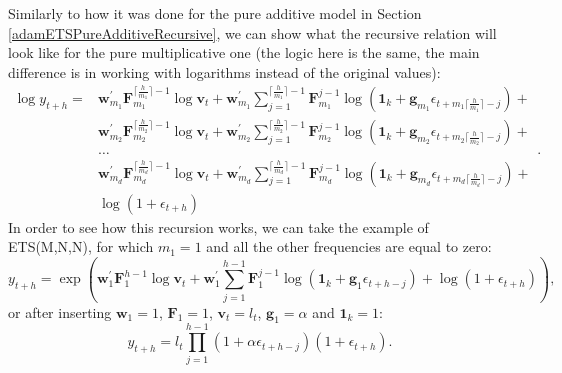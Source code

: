 \documentclass[
]{book}
\theoremstyle{definition}
\theoremstyle{definition}
\theoremstyle{definition}
\theoremstyle{definition}
\theoremstyle{remark}
\begin{document}
Similarly to how it was done for the pure additive model in Section \ref{adamETSPureAdditiveRecursive}, we can show what the recursive relation will look like for the pure multiplicative one (the logic here is the same, the main difference is in working with logarithms instead of the original values):
\begin{equation}
  \begin{aligned}
    \log y_{t+h} = & \mathbf{w}_{m_1}^\prime \mathbf{F}_{m_1}^{\lceil\frac{h}{m_1}\rceil-1} \log \mathbf{v}_{t} + \mathbf{w}_{m_1}^\prime \sum_{j=1}^{\lceil\frac{h}{m_1}\rceil-1} \mathbf{F}_{m_1}^{j-1} \log \left(\mathbf{1}_k + \mathbf{g}_{m_1} \epsilon_{t+m_1\lceil\frac{h}{m_1}\rceil-j}\right) + \\
    & \mathbf{w}_{m_2}^\prime \mathbf{F}_{m_2}^{\lceil\frac{h}{m_2}\rceil-1} \log \mathbf{v}_{t} + \mathbf{w}_{m_2}^\prime \sum_{j=1}^{\lceil\frac{h}{m_2}\rceil-1} \mathbf{F}_{m_2}^{j-1} \log \left(\mathbf{1}_k + \mathbf{g}_{m_2} \epsilon_{t+m_2\lceil\frac{h}{m_2}\rceil-j}\right) + \\
    & \dots \\
    & \mathbf{w}_{m_d}^\prime \mathbf{F}_{m_d}^{\lceil\frac{h}{m_d}\rceil-1} \log \mathbf{v}_{t} + \mathbf{w}_{m_d}^\prime \sum_{j=1}^{\lceil\frac{h}{m_d}\rceil-1} \mathbf{F}_{m_d}^{j-1} \log \left(\mathbf{1}_k + \mathbf{g}_{m_d} \epsilon_{t+m_d\lceil\frac{h}{m_d}\rceil-j}\right) + \\
    & \log \left(1 + \epsilon_{t+h}\right)
  \end{aligned}.
  \label{eq:ETSADAMStateSpacePureMultiplicativeRecursion}
\end{equation}
In order to see how this recursion works, we can take the example of ETS(M,N,N), for which \(m_1=1\) and all the other frequencies are equal to zero:
\begin{equation}
    y_{t+h} = \exp\left(\mathbf{w}_{1}^\prime \mathbf{F}_{1}^{h-1} \log\mathbf{v}_{t} + \mathbf{w}_{1}^\prime \sum_{j=1}^{h-1} \mathbf{F}_{1}^{j-1} \log \left(\mathbf{1}_k + \mathbf{g}_{1} \epsilon_{t+h-j}\right) +\log \left(1 + \epsilon_{t+h}\right)\right) ,
  \label{eq:ETSMNNADAMStateSpacePureMultiplicativeRecursion01}
\end{equation}
or after inserting \(\mathbf{w}_{1}=1\), \(\mathbf{F}_{1}=1\), \(\mathbf{v}_{t}=l_t\), \(\mathbf{g}_{1}=\alpha\) and \(\mathbf{1}_k=1\):
\begin{equation}
    y_{t+h} = l_t \prod_{j=1}^{h-1} \left(1 + \alpha \epsilon_{t+h-j}\right) \left(1 + \epsilon_{t+h}\right) .
  \label{eq:ETSMNNADAMStateSpacePureMultiplicativeRecursion02}
\end{equation}
\end{document}
